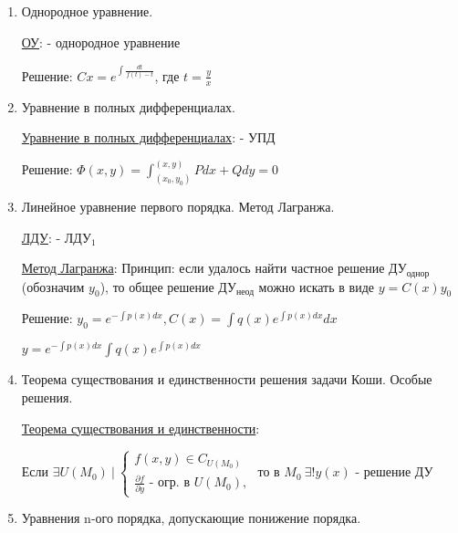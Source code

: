 \documentclass[12pt]{article}
\begin{document}
\begin{enumerate}
        \item Однородное уравнение.

        \hyperlink{homogeneousequation}{ОУ}:  - однородное уравнение

        Решение: $Cx = e^{\int\frac{dt}{f(t) - t}}$, где $t = \frac{y}{x}$

        \item Уравнение в полных дифференциалах.

        \hyperlink{equationincompletedifferentials}{Уравнение в полных дифференциалах}:  - УПД

        Решение: $\Phi(x, y) = \int^{(x,y)}_{(x_0,y_0)} Pdx + Qdy = 0$

        \item Линейное уравнение первого порядка. Метод Лагранжа.

        \hyperlink{lineardifferentialequation}{ЛДУ}:  - ЛДУ$_1$

        \hyperlink{methodLagrange}{Метод Лагранжа}: Принцип: если удалось найти частное решение ДУ$_\text{однор}$ (обозначим $y_0$), то общее решение ДУ$_\text{неод}$
        можно искать в виде $y = C(x)y_0$

        Решение: $y_0 = e^{-\int p(x) dx}, C(x) = \int q(x) e^{\int p(x)dx} dx$

        $y = e^{-\int p(x) dx} \int q(x) e^{\int p(x)dx} $

        \item Теорема существования и единственности решения задачи Коши. Особые решения.

        \hyperlink{existenceanduniquenessofsolution}{Теорема существования и единственности}: 
        \begin{MyTheorem}
            \Ths Если $\exists U(M_0) \ | \
            \begin{cases}
                f(x,y) \in C_{U(M_0)} \\
                \frac{\partial f}{\partial y}\text{ - огр. в } U(M_0),
            \end{cases}$ то в $M_0\ \exists! y(x)$ - решение ДУ
        \end{MyTheorem}


        \item Уравнения n-ого порядка, допускающие понижение порядка.


\end{enumerate}
\end{document}
